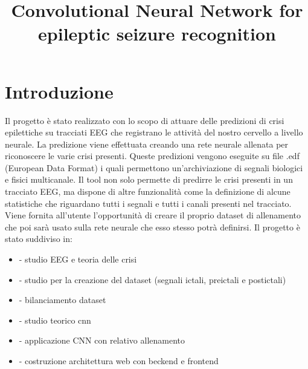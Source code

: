 \documentclass{article}
\begin{document}
\title{Convolutional Neural Network for epileptic seizure recognition}
\maketitle

\tableofcontents

\section*{Introduzione}
Il progetto è stato realizzato con lo scopo di attuare delle predizioni di crisi epilettiche su tracciati EEG che registrano le attività del nostro cervello a livello neurale.
La predizione viene effettuata creando una rete neurale allenata per riconoscere le varie crisi presenti.
Queste predizioni vengono eseguite su file .edf (European Data Format) i quali permettono un'archiviazione di segnali biologici e fisici multicanale.
Il tool non solo permette di predirre le crisi presenti in un tracciato EEG, ma dispone di altre funzionalità come la definizione di alcune statistiche che riguardano tutti i segnali e tutti i canali presenti nel tracciato.
Viene fornita all'utente l'opportunità di creare il proprio dataset di allenamento che poi sarà usato sulla rete neurale che esso stesso potrà definirsi. 
Il progetto è stato suddiviso in:
\begin{itemize}
\item- studio EEG e teoria delle crisi
\item- studio per la creazione del dataset (segnali ictali, preictali e postictali)
\item- bilanciamento dataset
\item- studio teorico cnn
\item- applicazione CNN con relativo allenamento
\item- costruzione architettura web con beckend e frontend 
\end{itemize}
\end{document}
